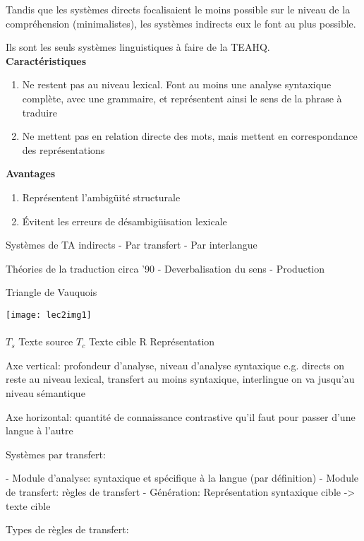 Tandis que les systèmes directs focalisaient le moins possible sur le niveau de
la compréhension (minimalistes), les systèmes indirects eux le font au plus possible.

Ils sont les seuls systèmes linguistiques à faire de la TEAHQ.\\

\textbf{Caractéristiques}

\begin{enumerate}
    \item Ne restent pas au niveau lexical. Font au moins une analyse syntaxique complète, avec une grammaire, et représentent ainsi le sens de la phrase à traduire
    \item Ne mettent pas en relation directe des mots, mais mettent en correspondance des représentations
\end{enumerate}

\textbf{Avantages}

\begin{enumerate}
    \item Représentent l’ambigüité structurale
    \item Évitent les erreurs de désambigüisation lexicale
\end{enumerate}

Systèmes de TA indirects
    - Par transfert
    - Par interlangue

Théories de la traduction circa '90
    - Deverbalisation du sens
    - Production

Triangle de Vauquois

\texttt{[image: lec2img1]}\\ \\

$T_s$ Texte source
$T_c$ Texte cible
R Représentation

Axe vertical: profondeur d'analyse, niveau d'analyse syntaxique
    e.g. directs on reste au niveau lexical, transfert au moins syntaxique, interlingue on va jusqu'au niveau sémantique

Axe horizontal: quantité de connaissance contrastive qu'il faut pour passer d'une langue à l'autre

Systèmes par transfert:

    - Module d'analyse: syntaxique et spécifique à la langue (par définition)
    - Module de transfert: règles de transfert
    - Génération: Représentation syntaxique cible -> texte cible

Types de règles de transfert:

